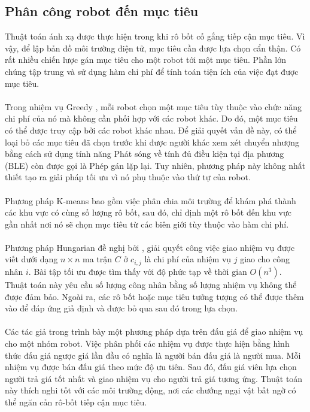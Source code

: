 \documentclass[11pt,openany]{book}
\begin{document}
\subsection{Phân công robot đến mục tiêu}
Thuật toán ánh xạ được thực hiện trong khi rô bốt cố gắng tiếp cận mục tiêu. Vì vậy, để lập bản đồ môi trường điện tử, mục tiêu cần được lựa chọn cẩn thận. Có rất nhiều chiến lược gán mục tiêu cho một robot tới một mục tiêu. Phần lớn chúng tập trung và sử dụng hàm chi phí để tính toán tiện ích của việc đạt được mục tiêu.\\\\
Trong nhiệm vụ Greedy \cite{yamauchi1998frontier}, mỗi robot chọn một mục tiêu tùy thuộc vào chức năng chi phí của nó mà không cần phối hợp với các robot khác. Do đó, một mục tiêu có thể được truy cập bởi các robot khác nhau. Để giải quyết vấn đề này, có thể loại bỏ các mục tiêu đã chọn trước khi được người khác xem xét chuyển nhượng bằng cách sử dụng tính năng Phát sóng về tính đủ điều kiện tại địa phương (BLE) \cite{werger2000broadcast} còn được gọi là Phép gán lặp lại. Tuy nhiên, phương pháp này không nhất thiết tạo ra giải pháp tối ưu vì nó phụ thuộc vào thứ tự của robot.\\\\
Phương pháp K-means \cite{solanas2004coordinated} bao gồm việc phân chia môi trường để khám phá thành các khu vực có cùng số lượng rô bốt, sau đó, chỉ định một rô bốt đến khu vực gần nhất nơi nó sẽ chọn mục tiêu từ các biên giới tùy thuộc vào hàm chi phí.\\\\
Phương pháp Hungarian \cite{deb1999multi} đề nghị bởi \cite{kuhn2005hungarian}, giải quyết công việc giao nhiệm vụ được viết dưới dạng $n \times n$ ma trận $C$ ở $c_{i,j}$ là chi phí của nhiệm vụ $j$ giao cho công nhân $i$. Bài tập tối ưu được tìm thấy với độ phức tạp về thời gian $O(n^3)$. Thuật toán này yêu cầu số lượng công nhân bằng số lượng nhiệm vụ không thể được đảm bảo. Ngoài ra, các rô bốt hoặc mục tiêu tưởng tượng có thể được thêm vào để đáp ứng giả định và được bỏ qua sau đó trong lựa chọn.\\\\
Các tác giả trong \cite{nanjanath2006dynamic} trình bày một phương pháp dựa trên đấu giá để giao nhiệm vụ cho một nhóm robot. Việc phân phối các nhiệm vụ được thực hiện bằng hình thức đấu giá ngược giá lần đầu có nghĩa là người bán đấu giá là người mua. Mỗi nhiệm vụ được bán đấu giá theo mức độ ưu tiên. Sau đó, đấu giá viên lựa chọn người trả giá tốt nhất và giao nhiệm vụ cho người trả giá tương ứng. Thuật toán này thích nghi tốt với các môi trường động, nơi các chướng ngại vật bất ngờ có thể ngăn cản rô-bốt tiếp cận mục tiêu.\\\\
\end{document}
